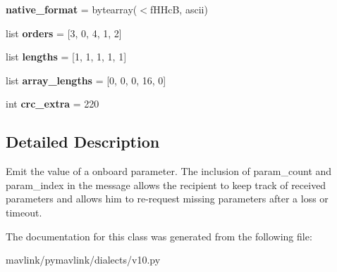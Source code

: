 \begin{DoxyCompactItemize}
\mbox{\label{classpymavlink_1_1dialects_1_1v10_1_1MAVLink__param__value__message_a6c5e4ada9bd1a065f4a339494ea2a9d5}} 
{\bfseries native\+\_\+format} = bytearray(\textquotesingle{}$<$f\+H\+HcB\textquotesingle{}, \textquotesingle{}ascii\textquotesingle{})
\item 
\mbox{\label{classpymavlink_1_1dialects_1_1v10_1_1MAVLink__param__value__message_add746c79d334e9fc56b6d92ffb3233c8}} 
list {\bfseries orders} = \mbox{[}3, 0, 4, 1, 2\mbox{]}
\item 
\mbox{\label{classpymavlink_1_1dialects_1_1v10_1_1MAVLink__param__value__message_a0bcaf45222b3bf8ccb6aad1bc0dcc080}} 
list {\bfseries lengths} = \mbox{[}1, 1, 1, 1, 1\mbox{]}
\item 
\mbox{\label{classpymavlink_1_1dialects_1_1v10_1_1MAVLink__param__value__message_a3f8acd5aed7cb2a6eeaec5fd5b3019be}} 
list {\bfseries array\+\_\+lengths} = \mbox{[}0, 0, 0, 16, 0\mbox{]}
\item 
\mbox{\label{classpymavlink_1_1dialects_1_1v10_1_1MAVLink__param__value__message_af8a635433868bc157a05a4311252fad3}} 
int {\bfseries crc\+\_\+extra} = 220
\end{DoxyCompactItemize}


\subsection{Detailed Description}
\begin{DoxyVerb}Emit the value of a onboard parameter. The inclusion of
param_count and param_index in the message allows the
recipient to keep track of received parameters and allows him
to re-request missing parameters after a loss or timeout.
\end{DoxyVerb}
 

The documentation for this class was generated from the following file\+:\begin{DoxyCompactItemize}
\item 
mavlink/pymavlink/dialects/v10.\+py\end{DoxyCompactItemize}
